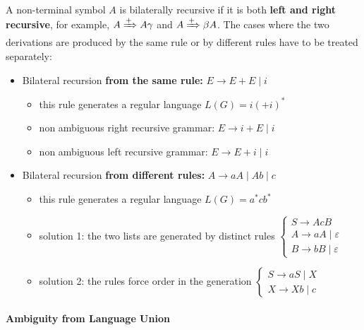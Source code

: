 \documentclass[english]{article}
\begin{document}
A non-terminal symbol \(A\) is bilaterally recursive if it is both \textbf{left and right recursive}, for example, \(A \xRightarrow{+} A \gamma\) and \(A \xRightarrow{+} \beta A\).
The cases where the two derivations are produced by the same rule or by different rules have to be treated separately:

\begin{itemize}
  \item Bilateral recursion \textbf{from the same rule:} \(E \rightarrow E + E \mid i\)
        \begin{itemize}
          \item this rule generates a regular language \(L(G) = i (+i)^\ast\)
          \item non ambiguous right recursive grammar: \(E \rightarrow i + E \mid i\)
          \item non ambiguous left recursive grammar: \(E \rightarrow E + i \mid i\)
        \end{itemize}
  \item Bilateral recursion \textbf{from different rules:} \(A \rightarrow aA \mid Ab \mid c\)
        \begin{itemize}
          \item this rule generates a regular language \(L(G) = a^\ast c b^\ast\)
          \item solution 1: the two lists are generated by distinct rules
                \(\begin{cases}
                  S  \rightarrow AcB                 \\
                  A  \rightarrow aA \mid \varepsilon \\
                  B  \rightarrow bB \mid \varepsilon
                \end{cases}\)
          \item solution 2: the rules force order in the generation
                \(\begin{cases}
                  S \rightarrow aS \mid X \\
                  X \rightarrow Xb \mid c
                \end{cases}\)
        \end{itemize}
\end{itemize}

\paragraph{Ambiguity from Language Union}
\end{document}
